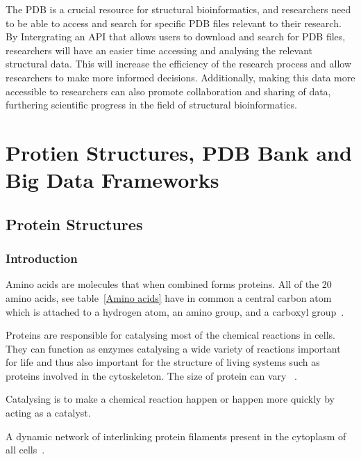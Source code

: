 \documentclass[]{final_report}
\begin{document}
The PDB is a crucial resource for structural bioinformatics, and researchers need to be able to access and search for specific PDB files relevant to their research. By Intergrating an API that allows users to download and search for PDB files, researchers will have an easier time accessing and analysing the relevant structural data. This will increase the efficiency of the research process and allow researchers to make more informed decisions. Additionally, making this data more accessible to researchers can also promote collaboration and sharing of data, furthering scientific progress in the field of structural bioinformatics.

\clearpage


\section{Protien Structures, PDB Bank and Big Data Frameworks}
\subsection{Protein Structures}
\subsubsection{Introduction}

Amino acids are molecules that when combined forms proteins. All of the 20 amino acids, see table~\ref{Amino acids} have in common a central carbon atom which is attached to a hydrogen atom, an amino group, and a carboxyl group~\cite{branden_introduction_1998}.

Proteins are responsible for catalysing most of the chemical reactions in cells. They can function as enzymes catalysing a wide variety of reactions important for life and thus also important for the structure of living systems such as proteins involved in the cytoskeleton. The size of protein can vary ~\cite{zvelebil_understanding_2008}.

\begin{definition}[Catalysing]
    Catalysing is to make a chemical reaction happen or happen more quickly by acting as a catalyst.
\end{definition}

\begin{definition}[Cytoskeleton]
    A dynamic network of interlinking protein filaments present in the cytoplasm of all cells~\cite{zvelebil_understanding_2008}. 
\end{definition}
\end{document}
